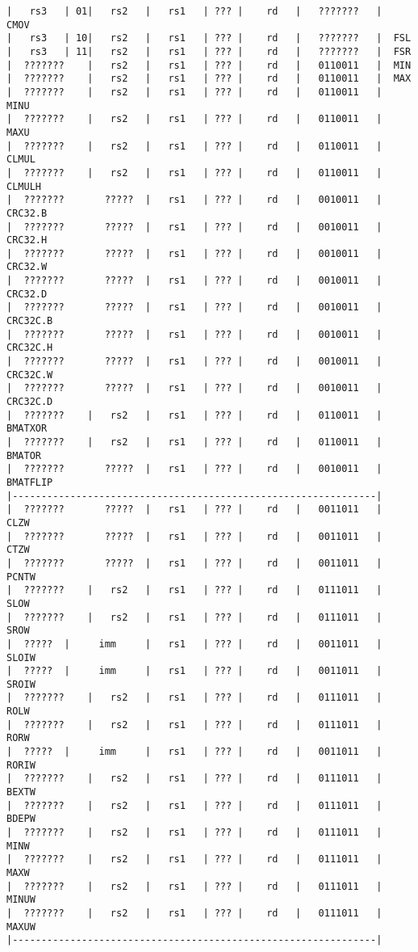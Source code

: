 \begin{verbatim}
|   rs3   | 01|   rs2   |   rs1   | ??? |    rd   |   ???????   |  CMOV
|   rs3   | 10|   rs2   |   rs1   | ??? |    rd   |   ???????   |  FSL
|   rs3   | 11|   rs2   |   rs1   | ??? |    rd   |   ???????   |  FSR
|  ???????    |   rs2   |   rs1   | ??? |    rd   |   0110011   |  MIN
|  ???????    |   rs2   |   rs1   | ??? |    rd   |   0110011   |  MAX
|  ???????    |   rs2   |   rs1   | ??? |    rd   |   0110011   |  MINU
|  ???????    |   rs2   |   rs1   | ??? |    rd   |   0110011   |  MAXU
|  ???????    |   rs2   |   rs1   | ??? |    rd   |   0110011   |  CLMUL
|  ???????    |   rs2   |   rs1   | ??? |    rd   |   0110011   |  CLMULH
|  ???????       ?????  |   rs1   | ??? |    rd   |   0010011   |  CRC32.B
|  ???????       ?????  |   rs1   | ??? |    rd   |   0010011   |  CRC32.H
|  ???????       ?????  |   rs1   | ??? |    rd   |   0010011   |  CRC32.W
|  ???????       ?????  |   rs1   | ??? |    rd   |   0010011   |  CRC32.D
|  ???????       ?????  |   rs1   | ??? |    rd   |   0010011   |  CRC32C.B
|  ???????       ?????  |   rs1   | ??? |    rd   |   0010011   |  CRC32C.H
|  ???????       ?????  |   rs1   | ??? |    rd   |   0010011   |  CRC32C.W
|  ???????       ?????  |   rs1   | ??? |    rd   |   0010011   |  CRC32C.D
|  ???????    |   rs2   |   rs1   | ??? |    rd   |   0110011   |  BMATXOR
|  ???????    |   rs2   |   rs1   | ??? |    rd   |   0110011   |  BMATOR
|  ???????       ?????  |   rs1   | ??? |    rd   |   0010011   |  BMATFLIP
|---------------------------------------------------------------|
|  ???????       ?????  |   rs1   | ??? |    rd   |   0011011   |  CLZW
|  ???????       ?????  |   rs1   | ??? |    rd   |   0011011   |  CTZW
|  ???????       ?????  |   rs1   | ??? |    rd   |   0011011   |  PCNTW
|  ???????    |   rs2   |   rs1   | ??? |    rd   |   0111011   |  SLOW
|  ???????    |   rs2   |   rs1   | ??? |    rd   |   0111011   |  SROW
|  ?????  |     imm     |   rs1   | ??? |    rd   |   0011011   |  SLOIW
|  ?????  |     imm     |   rs1   | ??? |    rd   |   0011011   |  SROIW
|  ???????    |   rs2   |   rs1   | ??? |    rd   |   0111011   |  ROLW
|  ???????    |   rs2   |   rs1   | ??? |    rd   |   0111011   |  RORW
|  ?????  |     imm     |   rs1   | ??? |    rd   |   0011011   |  RORIW
|  ???????    |   rs2   |   rs1   | ??? |    rd   |   0111011   |  BEXTW
|  ???????    |   rs2   |   rs1   | ??? |    rd   |   0111011   |  BDEPW
|  ???????    |   rs2   |   rs1   | ??? |    rd   |   0111011   |  MINW
|  ???????    |   rs2   |   rs1   | ??? |    rd   |   0111011   |  MAXW
|  ???????    |   rs2   |   rs1   | ??? |    rd   |   0111011   |  MINUW
|  ???????    |   rs2   |   rs1   | ??? |    rd   |   0111011   |  MAXUW
|---------------------------------------------------------------|
\end{verbatim}
